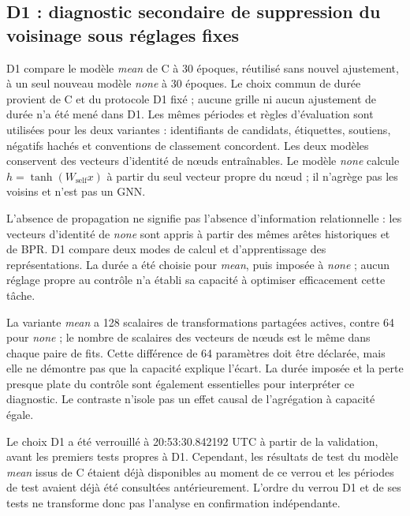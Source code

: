 \subsection{D1 : diagnostic secondaire de suppression du voisinage sous réglages fixes}

D1 compare le modèle \emph{mean} de C à 30 époques, réutilisé sans nouvel ajustement, à un seul nouveau modèle \emph{none} à 30 époques. Le choix commun de durée provient de C et du protocole D1 fixé ; aucune grille ni aucun ajustement de durée n'a été mené dans D1. Les mêmes périodes et règles d'évaluation sont utilisées pour les deux variantes : identifiants de candidats, étiquettes, soutiens, négatifs hachés et conventions de classement concordent. Les deux modèles conservent des vecteurs d'identité de nœuds entraînables. Le modèle \emph{none} calcule $h=\tanh(W_{\mathrm{self}}x)$ à partir du seul vecteur propre du nœud ; il n'agrège pas les voisins et n'est pas un GNN.

L'absence de propagation ne signifie pas l'absence d'information relationnelle : les vecteurs d'identité de \emph{none} sont appris à partir des mêmes arêtes historiques et de BPR. D1 compare deux modes de calcul et d'apprentissage des représentations. La durée a été choisie pour \emph{mean}, puis imposée à \emph{none} ; aucun réglage propre au contrôle n'a établi sa capacité à optimiser efficacement cette tâche.

La variante \emph{mean} a 128 scalaires de transformations partagées actives, contre 64 pour \emph{none} ; le nombre de scalaires des vecteurs de nœuds est le même dans chaque paire de fits. Cette différence de 64 paramètres doit être déclarée, mais elle ne démontre pas que la capacité explique l'écart. La durée imposée et la perte presque plate du contrôle sont également essentielles pour interpréter ce diagnostic. Le contraste n'isole pas un effet causal de l'agrégation à capacité égale.

Le choix D1 a été verrouillé à 20:53:30.842192 UTC à partir de la validation, avant les premiers tests propres à D1. Cependant, les résultats de test du modèle \emph{mean} issus de C étaient déjà disponibles au moment de ce verrou et les périodes de test avaient déjà été consultées antérieurement. L'ordre du verrou D1 et de ses tests ne transforme donc pas l'analyse en confirmation indépendante.

\begin{table}[!htbp]\centering\scriptsize\setlength{\tabcolsep}{2.5pt}
\caption{D1 : rappel micro@10 sur les cohortes avec au moins un lien positif, au soutien historique $\geq1$. Mean30 est conservé de C ; none30 est nouvellement ajusté dans D1. Les liens retrouvés sont indiqués entre parenthèses. Aucun intervalle n'est associé au contraste.}
\label{tab:aggregation-rc2}

\end{table}

